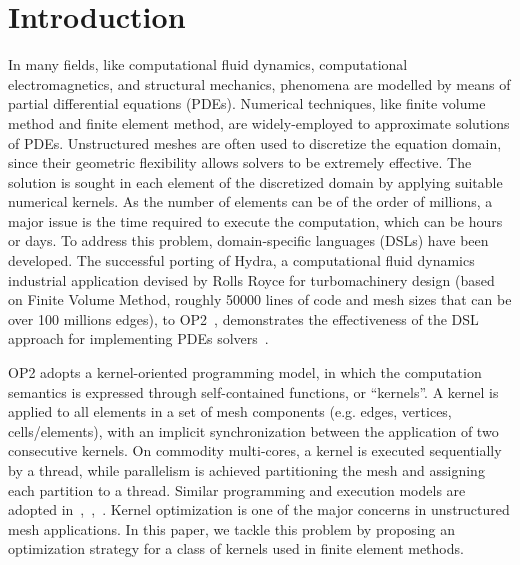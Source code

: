\documentclass[conference]{IEEEtran}
\begin{document}
\section{Introduction}
In many fields, like computational fluid dynamics, computational electromagnetics, and structural mechanics, phenomena are modelled by means of partial differential equations (PDEs). Numerical techniques, like finite volume method and finite element method, are widely-employed to approximate solutions of PDEs. Unstructured meshes are often used to discretize the equation domain, since their geometric flexibility allows solvers to be extremely effective. The solution is sought in each element of the discretized domain by applying suitable numerical kernels. As the number of elements can be of the order of millions, a major issue is the time required to execute the computation, which can be hours or days. To address this problem, domain-specific languages (DSLs) have been developed. The successful porting of Hydra, a computational fluid dynamics industrial application devised by Rolls Royce for turbomachinery design (based on Finite Volume Method, roughly 50000 lines of code and mesh sizes that can be over 100 millions edges), to OP2~\cite{pyop2isc}, demonstrates the effectiveness of the DSL approach for implementing PDEs solvers~\cite{IstvanHydra}. 

OP2 adopts a kernel-oriented programming model, in which the computation semantics is expressed through self-contained functions, or ``kernels''. A kernel is applied to all elements in a set of mesh components (e.g. edges, vertices, cells/elements), with an implicit synchronization between the application of two consecutive kernels. On commodity multi-cores, a kernel is executed sequentially by a thread, while parallelism is achieved partitioning the mesh and assigning each partition to a thread. Similar programming and execution models are adopted in~\cite{Fenics},~\cite{fluidity_manual_v4},~\cite{lizst}. Kernel optimization is one of the major concerns in unstructured mesh applications. In this paper, we tackle this problem by proposing an optimization strategy for a class of kernels used in finite element methods.
\end{document}
